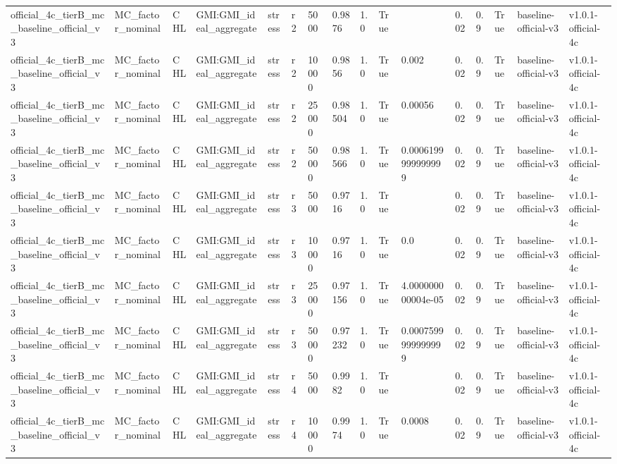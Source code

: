 \begin{table}[!htbp]
\begin{tabular}{llllllllllllllll}
official\_4c\_tierB\_mc\_baseline\_official\_v3 & MC\_factor\_nominal & CHL & GMI:GMI\_ideal\_aggregate & stress & r2 & 5000 & 0.9876 & 1.0 & True &  & 0.02 & 0.9 & True & baseline-official-v3 & v1.0.1-official-4c \\
official\_4c\_tierB\_mc\_baseline\_official\_v3 & MC\_factor\_nominal & CHL & GMI:GMI\_ideal\_aggregate & stress & r2 & 10000 & 0.9856 & 1.0 & True & 0.002 & 0.02 & 0.9 & True & baseline-official-v3 & v1.0.1-official-4c \\
official\_4c\_tierB\_mc\_baseline\_official\_v3 & MC\_factor\_nominal & CHL & GMI:GMI\_ideal\_aggregate & stress & r2 & 25000 & 0.98504 & 1.0 & True & 0.00056 & 0.02 & 0.9 & True & baseline-official-v3 & v1.0.1-official-4c \\
official\_4c\_tierB\_mc\_baseline\_official\_v3 & MC\_factor\_nominal & CHL & GMI:GMI\_ideal\_aggregate & stress & r2 & 50000 & 0.98566 & 1.0 & True & 0.0006199999999999 & 0.02 & 0.9 & True & baseline-official-v3 & v1.0.1-official-4c \\
official\_4c\_tierB\_mc\_baseline\_official\_v3 & MC\_factor\_nominal & CHL & GMI:GMI\_ideal\_aggregate & stress & r3 & 5000 & 0.9716 & 1.0 & True &  & 0.02 & 0.9 & True & baseline-official-v3 & v1.0.1-official-4c \\
official\_4c\_tierB\_mc\_baseline\_official\_v3 & MC\_factor\_nominal & CHL & GMI:GMI\_ideal\_aggregate & stress & r3 & 10000 & 0.9716 & 1.0 & True & 0.0 & 0.02 & 0.9 & True & baseline-official-v3 & v1.0.1-official-4c \\
official\_4c\_tierB\_mc\_baseline\_official\_v3 & MC\_factor\_nominal & CHL & GMI:GMI\_ideal\_aggregate & stress & r3 & 25000 & 0.97156 & 1.0 & True & 4.000000000004e-05 & 0.02 & 0.9 & True & baseline-official-v3 & v1.0.1-official-4c \\
official\_4c\_tierB\_mc\_baseline\_official\_v3 & MC\_factor\_nominal & CHL & GMI:GMI\_ideal\_aggregate & stress & r3 & 50000 & 0.97232 & 1.0 & True & 0.0007599999999999 & 0.02 & 0.9 & True & baseline-official-v3 & v1.0.1-official-4c \\
official\_4c\_tierB\_mc\_baseline\_official\_v3 & MC\_factor\_nominal & CHL & GMI:GMI\_ideal\_aggregate & stress & r4 & 5000 & 0.9982 & 1.0 & True &  & 0.02 & 0.9 & True & baseline-official-v3 & v1.0.1-official-4c \\
official\_4c\_tierB\_mc\_baseline\_official\_v3 & MC\_factor\_nominal & CHL & GMI:GMI\_ideal\_aggregate & stress & r4 & 10000 & 0.9974 & 1.0 & True & 0.0008 & 0.02 & 0.9 & True & baseline-official-v3 & v1.0.1-official-4c \\

\end{tabular}
\end{table}
